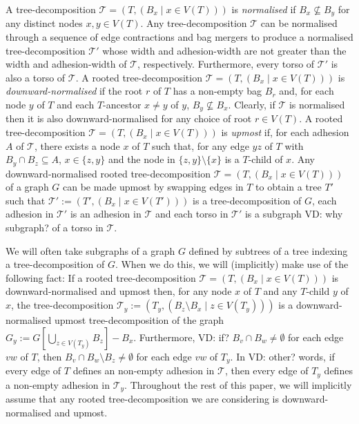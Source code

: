 \documentclass{patmorin}
\newcommand{\vida}[1]{{\color{pink} VD: #1}}
\newcommand{\pat}[1]{\textcolor{Magenta}{PaMo: #1}}
\newcommand{\gwen}[1]{\textcolor{Purple}{GJ: #1}}
\newcommand{\defin}[1]{\emph{\textcolor{brightmaroon}{#1}}}
\newcommand{\calT}{\mathcal{T}}
\begin{document}
  A tree-decomposition $\calT=(T,(B_x \mid x\in V(T)))$ is \defin{normalised} if $B_x\not\subseteq B_y$ for any distinct nodes $x,y\in V(T)$.   Any tree-decomposition $\mathcal{T}$ can be normalised through a sequence of edge contractions and bag mergers to produce a normalised tree-decomposition $\mathcal{T}'$ whose width and adhesion-width are not greater than the width and adhesion-width of $\mathcal{T}$, respectively. Furthermore, every torso of $\mathcal{T}'$ is also a torso of $\mathcal{T}$.  A rooted tree-decomposition $\calT=(T,(B_x \mid x\in V(T)))$ is \defin{downward-normalised} if the root $r$ of $T$ has a non-empty bag $B_r$ and, for each node $y$ of $T$ and each $T$-ancestor $x\neq y$ of $y$, $B_y\not\subseteq B_x$.  Clearly, if $\mathcal{T}$ is normalised then it is also downward-normalised for any choice of root $r\in V(T)$.  A rooted tree-decomposition $\calT=(T,(B_x \mid x\in V(T)))$ is \defin{upmost} if, for each adhesion $A$ of $\calT$, there exists a node $x$ of $T$ such that, for any edge $yz$ of $T$ with $B_y\cap B_z\subseteq A$, $x\in\{z,y\}$ and the node in $\{z,y\}\setminus\{x\}$ is a $T$-child of $x$.  Any downward-normalised rooted tree-decomposition $\calT=(T,(B_x \mid x\in V(T)))$ of a graph $G$ can be made upmost by swapping edges in $T$
  to obtain a tree $T'$ such that $\mathcal{T}':=(T', (B_x \mid x\in V(T')))$ is a tree-decomposition of $G$, each adhesion in $\mathcal{T}'$ is an adhesion in $\mathcal{T}$ and each torso in $\mathcal{T}'$ is a subgraph\vida{why subgraph?} of a torso in $\mathcal{T}$.

  We will often take subgraphs of a graph $G$ defined by subtrees of a tree indexing a tree-decomposition of $G$.  When we do this, we will  (implicitly) make use of the following fact: If a rooted tree-decomposition $\calT=(T,(B_x \mid x\in V(T)))$ is downward-normalised and upmost then, for any node $x$ of $T$ and any $T$-child $y$ of $x$, the tree-decomposition $\mathcal{T}_y:=(T_y,(B_z\setminus B_x\mid z\in V(T_y)))$ is a downward-normalised upmost tree-decomposition of the graph $G_y:=G[\bigcup_{z\in V(T_y)} B_z]-B_x$.   Furthermore,\vida{if?} $B_v\cap B_w\neq\emptyset$ for each edge $vw$ of $T$, then $B_v\cap B_w\setminus B_z\neq\emptyset$ for each edge $vw$ of $T_y$. In \vida{other?} words, if every edge of $T$ defines an non-empty adhesion in $\mathcal{T}$, then every edge of $T_y$ defines a non-empty adhesion in $\mathcal{T}_y$.
  Throughout the rest of this paper, we will implicitly assume that any rooted tree-decomposition we are considering is downward-normalised and upmost.
\end{document}
